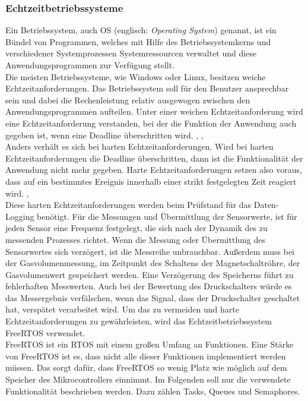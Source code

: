 \subsubsection{Echtzeitbetriebssysteme}
Ein Betriebssystem, auch OS (englisch: \textit{Operating System}) genannt, ist ein Bündel von Programmen, welches mit Hilfe des Betriebssystemkerns und verschiedener Systemprozessen Systemressourcen verwaltet und diese Anwendungsprogrammen zur Verfügung stellt.
\cite[][S. 17]{Baun2017}
\\
Die meisten Betriebssysteme, wie Windows oder Linux, besitzen weiche Echtzeitanforderungen. Das Betriebssystem soll für den Benutzer ansprechbar sein und dabei die Rechenleistung relativ ausgewogen zwischen den Anwendungsprogrammen aufteilen. Unter einer weichen Echtzeitanforderung wird eine Echtzeitanforderung verstanden, bei der die Funktion der Anwendung auch gegeben ist, wenn eine Deadline überschritten wird.
\cite[][S. 28]{Baun2017},
\cite[][S. 141f]{SamSiewert2016},
\cite{FRTOS_RTA}
\\
Anders verhält es sich bei harten Echtzeitanforderungen. Wird bei harten Echtzeitanforderungen die Deadline überschritten, dann ist die Funktionalität der Anwendung nicht mehr gegeben. Harte Echtzeitanforderungen setzen also voraus, dass auf ein bestimmtes Ereignis innerhalb einer strikt festgelegten Zeit reagiert wird. 
\cite[][S. 28]{Baun2017},
\cite[][S. 31f]{Tanenbaum2002}
\\
Diese harten Echtzeitanforderungen werden beim Prüfstand für das Daten-Logging benötigt. Für die Messungen und Übermittlung der Sensorwerte, ist für jeden Sensor eine Frequenz festgelegt, die sich nach der Dynamik des zu messenden Prozesses richtet. Wenn die Messung oder Übermittlung des Sensorwertes sich verzögert, ist die Messreihe unbrauchbar. Außerdem muss bei der Gasvolumenmessung, im Zeitpunkt des Schaltens der Magnetschaltröhre, der Gasvolumenwert gespeichert werden. Eine Verzögerung des Speicherns führt zu fehlerhaften Messwerten. Auch bei der Bewertung des Druckschalters würde es das Messergebnis verfälschen, wenn das Signal, dass der Druckschalter geschaltet hat, verspätet verarbeitet wird. Um das zu vermeiden und harte Echtzeitanforderungen zu gewährleisten, wird das Echtzeitbetriebssystem FreeRTOS verwendet.
\\
FreeRTOS ist ein RTOS mit einem großen Umfang an Funktionen. Eine Stärke von FreeRTOS ist es, dass nicht alle dieser Funktionen implementiert werden müssen. Das sorgt dafür, dass FreeRTOS so wenig Platz wie möglich auf dem Speicher des Mikrocontrollers einnimmt. Im Folgenden soll nur die verwendete Funktionalität beschrieben werden. Dazu zählen Tasks, Queues und Semaphores.

